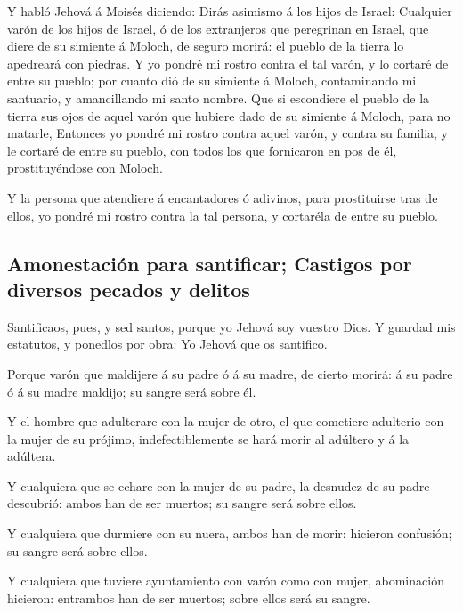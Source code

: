  Y habló Jehová á Moisés diciendo:  Dirás
asimismo á los hijos de Israel: Cualquier varón de los hijos de Israel,
ó de los extranjeros que peregrinan en Israel, que diere de su simiente
á Moloch, de seguro morirá: el pueblo de la tierra lo apedreará con
piedras.  Y yo pondré mi rostro contra el tal varón, y lo
cortaré de entre su pueblo; por cuanto dió de su simiente á Moloch,
contaminando mi santuario, y amancillando mi santo nombre. 
Que si escondiere el pueblo de la tierra sus ojos de aquel varón que
hubiere dado de su simiente á Moloch, para no matarle, 
Entonces yo pondré mi rostro contra aquel varón, y contra su familia, y
le cortaré de entre su pueblo, con todos los que fornicaron en pos de
él, prostituyéndose con Moloch.

 Y la persona que atendiere á encantadores ó adivinos, para
prostituirse tras de ellos, yo pondré mi rostro contra la tal persona, y
cortaréla de entre su pueblo.

\hypertarget{amonestaciuxf3n-para-santificar-castigos-por-diversos-pecados-y-delitos}{%
\subsection{Amonestación para santificar; Castigos por diversos pecados
y
delitos}\label{amonestaciuxf3n-para-santificar-castigos-por-diversos-pecados-y-delitos}}

 Santificaos, pues, y sed santos, porque yo Jehová soy
vuestro Dios.  Y guardad mis estatutos, y ponedlos por obra:
Yo Jehová que os santifico.

 Porque varón que maldijere á su padre ó á su madre, de
cierto morirá: á su padre ó á su madre maldijo; su sangre será sobre él.

 Y el hombre que adulterare con la mujer de otro, el que
cometiere adulterio con la mujer de su prójimo, indefectiblemente se
hará morir al adúltero y á la adúltera.

 Y cualquiera que se echare con la mujer de su padre, la
desnudez de su padre descubrió: ambos han de ser muertos; su sangre será
sobre ellos.

 Y cualquiera que durmiere con su nuera, ambos han de
morir: hicieron confusión; su sangre será sobre ellos.

 Y cualquiera que tuviere ayuntamiento con varón como con
mujer, abominación hicieron: entrambos han de ser muertos; sobre ellos
será su sangre.

